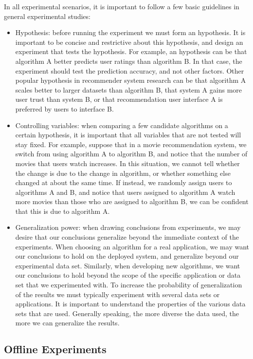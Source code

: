 In all experimental scenarios, it is important to follow a few basic guidelines in general experimental studies:

\begin{itemize}
	\item Hypothesis: before running the experiment we must form an hypothesis. It is important to be concise and restrictive about this hypothesis, and design an experiment that tests the hypothesis. For example, an hypothesis can be that algorithm A better predicts user ratings than algorithm B. In that case, the experiment should test the prediction accuracy, and not other factors. Other popular hypothesis in recommender system research can be that algorithm A scales better to larger datasets than algorithm B, that system A gains more user trust than system B, or that recommendation user interface A is preferred by users to interface B.
	\item Controlling variables: when comparing a few candidate algorithms on a certain hypothesis, it is important that all variables that are not tested will stay fixed. For example, suppose that in a movie recommendation system, we switch from using algorithm A to algorithm B, and notice that the number of movies that users watch increases. In this situation, we cannot tell whether the change is due to the change in algorithm, or whether something else changed at about the same time. If instead, we randomly assign users to algorithms A and B, and notice that users assigned to algorithm A watch more movies than those who are assigned to algorithm B, we can be confident that this is due to algorithm A.
	\item Generalization power: when drawing conclusions from experiments, we may desire that our conclusions generalize beyond the immediate context of the experiments. When choosing an algorithm for a real application, we may want our conclusions to hold on the deployed system, and generalize beyond our experimental data set. Similarly, when developing new algorithms, we want our conclusions to hold beyond the scope of the specific application or data set that we experimented with. To increase the probability of generalization of the results we must typically experiment with several data sets or applications. It is important to understand the properties of the various data sets that are used. Generally speaking, the more diverse the data used, the more we can generalize the results.
\end{itemize}

\subsection{Offline Experiments}


